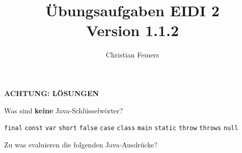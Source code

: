 \documentclass[11pt]{exam} %
\title{Übungsaufgaben EIDI 2 \\ \small \color{magenta}Version 1.1.2}
\author{Christian Femers}
\newcommand{\code}[1]{\texttt|#1|}
\newcommand{\fillinline}[1]{\ifprintanswers\fillin[\code{#1}][3cm]\fi\xrfill[-1pt]{0.2mm}}
\begin{document}
\maketitle


\ifprintanswers
\begin{framed}{\vspace{8.5cm}\begin{center}\color{red}\textbf{ACHTUNG: LÖSUNGEN}\end{center}\vspace{8.75cm}}\end{framed}
\newpage
\fi

\begin{questions}
\question Was sind \textbf{keine} Java-Schlüsselwörter?
\begin{checkboxes}
\choice \texttt{final}
\choice \texttt{const}
\CorrectChoice \texttt{var}
\choice \texttt{short}
\CorrectChoice \texttt{false}
\choice \texttt{case}
\choice \texttt{class}
\CorrectChoice \texttt{main}
\choice \texttt{static}
\choice \texttt{throw}
\choice \texttt{throws}
\CorrectChoice \texttt{null}
\end{checkboxes}
\filbreak
\question Zu was evaluieren die folgenden Java-Ausdrücke? 
\end{questions}
\end{document}
